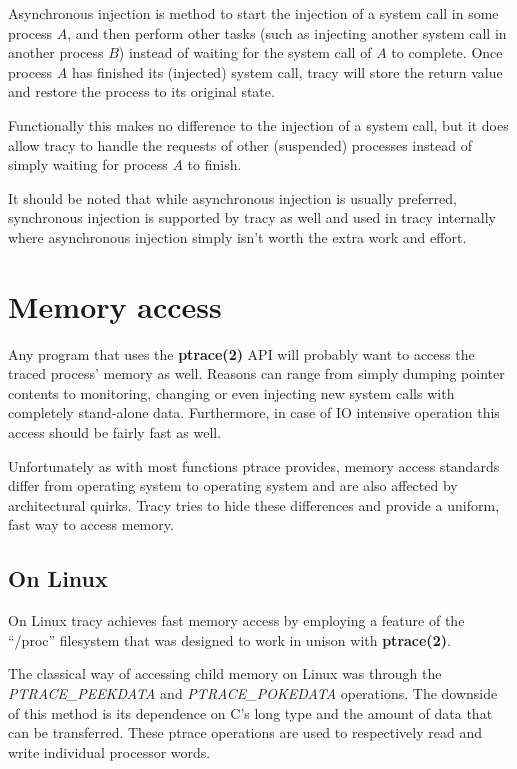 \documentclass[a4paper, 10pt]{report}
\begin{document}
Asynchronous injection is method to start the injection of a system call in
some process $A$, and then perform other tasks (such as injecting another
system call in another process $B$) instead of waiting for the system call
of $A$ to complete.
Once process $A$ has finished its (injected) system call, tracy will store
the return value and restore the process to its original state.

Functionally this makes no difference to the injection of a system call, but
it does allow tracy to handle the requests of other (suspended) processes
instead of simply waiting for process $A$ to finish.

It should be noted that while asynchronous injection is usually preferred,
synchronous injection is supported by tracy as well and used in tracy
internally where asynchronous injection simply isn't worth the extra work
and effort.

\section{Memory access}


Any program that uses the \textbf{ptrace(2)} API will probably want to access the
traced process' memory as well. Reasons can range from simply dumping pointer
contents to monitoring, changing or even injecting new system calls with
completely stand-alone data. Furthermore, in case of IO intensive operation
this access should be fairly fast as well.

Unfortunately as with most functions ptrace provides, memory access standards
differ from operating system to operating system and are also
affected by architectural quirks. Tracy tries to hide these differences and
provide a uniform, fast way to access memory.

\subsection{On Linux}
On Linux tracy achieves fast memory access by employing a feature of the
``/proc'' filesystem that was designed to work in unison with
\textbf{ptrace(2)}.

The classical way of accessing child memory on Linux was through the
\textit{PTRACE\_PEEKDATA} and \textit{PTRACE\_POKEDATA} operations.
The downside of this method is its dependence on C's long type and the
amount of data that can be transferred.
These ptrace operations are used to respectively read and write individual
processor words.
\end{document}

